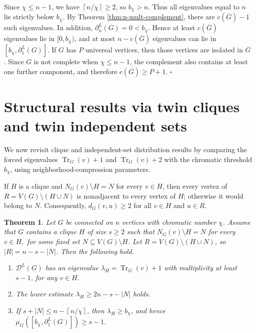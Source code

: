 \documentclass[12pt]{article}
\newcommand{\DL}{\mathcal{D}^{L}}
\newcommand{\comp}[1]{\overline{#1}}
\newcommand{\ceil}[1]{\left\lceil #1 \right\rceil}
\newcommand{\Tr}{\operatorname{Tr}}
\theoremstyle{plain}
\newtheorem{theorem}{Theorem}[section]
\theoremstyle{definition}
\renewenvironment{proof}{{\noindent\bfseries Proof. }}{\hfill$\square$\par}
\begin{document}
\begin{proof}
Since $\chi\le n-1$, we have $\ceil{n/\chi}\ge2$, so $b_\chi>n$. Thus all eigenvalues equal to $n$ lie strictly below
$b_\chi$. By Theorem \ref{thm:n-mult-complement}, there are $c(\comp{G})-1$ such eigenvalues. In addition,
$\partial_n^L(G)=0<b_\chi$. Hence at least $c(\comp{G})$ eigenvalues lie in $[0,b_\chi)$, and at most
$n-c(\comp{G})$ eigenvalues can lie in $[b_\chi,\partial_1^L(G)]$. If $G$ has $P$ universal vertices, then those vertices are
isolated in $\comp{G}$. Since $G$ is not complete when $\chi\le n-1$, the complement also contains at least one further component,
and therefore $c(\comp{G})\ge P+1$.
\end{proof}



\section{Structural results via twin cliques and twin independent sets}\label{section 4}

We now revisit clique and independent-set distribution results by comparing the forced eigenvalues
$\Tr_G(v)+1$ and $\Tr_G(v)+2$ with the chromatic threshold $b_\chi$, using neighborhood-compression parameters.

\noindent If $H$ is a clique and $N_G(v)\setminus H=N$ for every $v\in H$, then every vertex of
$R=V(G)\setminus(H\cup N)$ is nonadjacent to every vertex of $H$; otherwise it would belong to $N$. Consequently,
$d_G(v,u)\ge2$ for all $v\in H$ and $u\in R$.

\begin{theorem}\label{thm:clique-refine}
Let $G$ be connected on $n$ vertices with chromatic number $\chi$. Assume that $G$ contains a clique $H$ of size $s\ge2$ such
that $N_G(v)\setminus H=N$ for every $v\in H, $ for some fixed set $N\subseteq V(G)\setminus H$. Let
$R=V(G)\setminus(H\cup N)$, so $|R|=n-s-|N|$. Then the following hold.
\begin{enumerate}[label=\textup{(\alph*)},noitemsep]
    \item $\DL(G)$ has an eigenvalue $\lambda_H=\Tr_G(v)+1$ with multiplicity at least $s-1$, for any $v\in H$.
    \item The lower estimate $\lambda_H\ge 2n-s-|N|$ holds.
    \item If $s+|N|\le n-\ceil{n/\chi}$, then $\lambda_H\ge b_\chi$, and hence
     $ \mu_G([b_\chi,\partial_1^L(G)])\ge s-1.$ 
\end{enumerate}
\end{theorem}
\end{document}

